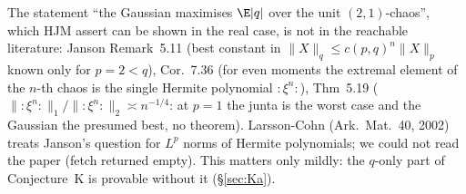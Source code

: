 \begin{negative}
The statement ``the Gaussian maximises $\E|q|$ over the unit $(2,1)$-chaos'', which HJM assert can be shown in the real case, is not in the reachable
literature: Janson Remark~5.11 (best constant in $\|X\|_q\le c(p,q)^n\|X\|_p$ known only for $p=2<q$), Cor.~7.36 (for even moments the extremal element of
the $n$-th chaos is the single Hermite polynomial $:\xi^n:$), Thm~5.19 ($\|:\xi^n:\|_1/\|:\xi^n:\|_2\asymp n^{-1/4}$: at $p=1$ the junta is the worst case and
the Gaussian the presumed best, no theorem). Larsson-Cohn (Ark.\ Mat.\ 40, 2002) treats Janson's question for $L^p$ norms of Hermite polynomials; we could
not read the paper (fetch returned empty). This matters only mildly: the $q$-only part of Conjecture~K is provable without it (\S\ref{sec:Ka}).
\end{negative}


